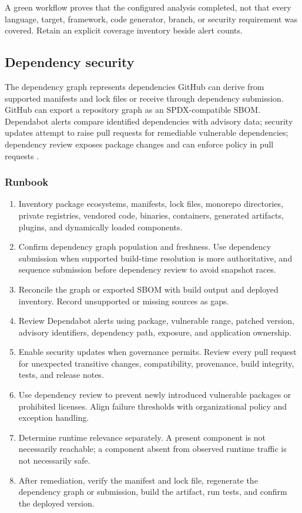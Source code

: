 \documentclass[11pt,letterpaper]{article}
\begin{document}
\begin{warnbox}
A green workflow proves that the configured analysis completed, not that every language, target, framework, code generator, branch, or security requirement was covered. Retain an explicit coverage inventory beside alert counts.
\end{warnbox}

\subsection{Dependency security}

The dependency graph represents dependencies GitHub can derive from supported manifests and lock files or receive through dependency submission. GitHub can export a repository graph as an SPDX-compatible SBOM. Dependabot alerts compare identified dependencies with advisory data; security updates attempt to raise pull requests for remediable vulnerable dependencies; dependency review exposes package changes and can enforce policy in pull requests \citep{githubfeatures,githubdependencyreview,githubdependabot}.

\subsubsection{Runbook}

\begin{enumerate}
  \item Inventory package ecosystems, manifests, lock files, monorepo directories, private registries, vendored code, binaries, containers, generated artifacts, plugins, and dynamically loaded components.
  \item Confirm dependency graph population and freshness. Use dependency submission when supported build-time resolution is more authoritative, and sequence submission before dependency review to avoid snapshot races.
  \item Reconcile the graph or exported SBOM with build output and deployed inventory. Record unsupported or missing sources as gaps.
  \item Review Dependabot alerts using package, vulnerable range, patched version, advisory identifiers, dependency path, exposure, and application ownership.
  \item Enable security updates when governance permits. Review every pull request for unexpected transitive changes, compatibility, provenance, build integrity, tests, and release notes.
  \item Use dependency review to prevent newly introduced vulnerable packages or prohibited licenses. Align failure thresholds with organizational policy and exception handling.
  \item Determine runtime relevance separately. A present component is not necessarily reachable; a component absent from observed runtime traffic is not necessarily safe.
  \item After remediation, verify the manifest and lock file, regenerate the dependency graph or submission, build the artifact, run tests, and confirm the deployed version.
\end{enumerate}
\end{document}
